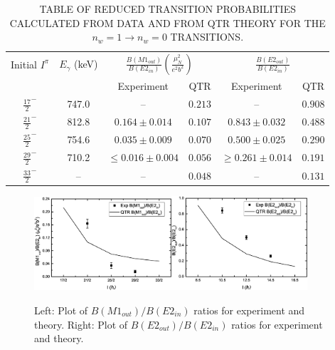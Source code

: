 \begin{table}
\begin{center}
\caption{TABLE OF REDUCED TRANSITION PROBABILITIES CALCULATED FROM DATA AND FROM QTR THEORY FOR THE $n_w=1 \rightarrow n_w=0$ TRANSITIONS.\label{tbl:chp4-transitition-ratios}}
\centering
\begin{tabular}{|c|c|c|c|c|c|}
\toprule
Initial $I^\pi{}$ &$E_{\gamma}$ (keV) & \multicolumn{2}{c|}{ $\frac{B(M1_{out})}{B(E2_{in})}(\frac{\mu_N^2}{e^2b^2})$} & \multicolumn{2}{c|}{$\frac{B(E2_{out})}{B(E2_{in})}$} \\
& & Experiment & QTR & Experiment & QTR \\
\midrule
$\frac{17}{2}^-$ & 747.0 & -- & $0.213$ & -- & $0.908$ \\
$\frac{21}{2}^-$ & 812.8 &  $0.164\pm0.014$ & $0.107$ &  $0.843\pm0.032$ & $0.488$ \\
$\frac{25}{2}^-$ & 754.6 &   $0.035\pm0.009$ & $0.070$ &  $0.500\pm0.025$ & $0.290$ \\
$\frac{29}{2}^-$ & 710.2 & $\leq0.016\pm0.004$ & $0.056$ & $\geq 0.261\pm0.014$ & $0.191$ \\
$\frac{33}{2}^-$ & -- & -- & $0.048$ & -- & $0.131$ \\
\bottomrule
\end{tabular}
\end{center}
\end{table}

\begin{figure}[th!]
\centerline{\includegraphics[width=0.455\textwidth]{./img/c4/m1_trans_prob.eps}\hspace{0.08\textwidth}\includegraphics[width=0.45\textwidth]{./img/c4/e2_trans_prob.eps}}
	\caption{Left: Plot of $B(M1_{out})/B(E2_{in})$ ratios for experiment and theory. Right: Plot of $B(E2_{out})/B(E2_{in})$ ratios for experiment and theory.\label{fig:chp4-trans-prob-ratios}}
\end{figure}

